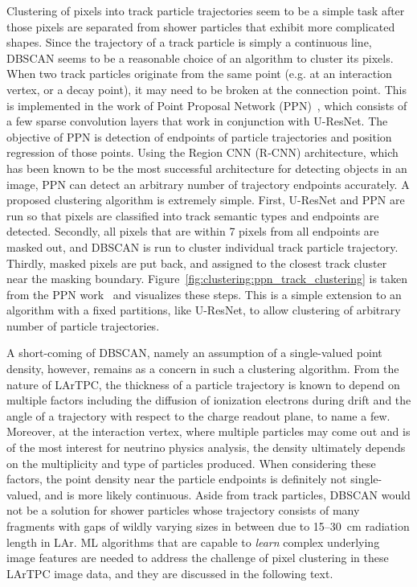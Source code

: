 \documentclass{ws-rv9x6}
\begin{document}
Clustering of pixels into track particle trajectories seem to be a simple task after those pixels are separated from shower particles that exhibit more complicated shapes. Since the trajectory of a track particle is simply a continuous line, DBSCAN seems to be a reasonable choice of an algorithm to cluster its pixels. When two track particles originate from the same point (e.g. at an interaction vertex, or a decay point), it may need to be broken at the connection point. This is implemented in the work of Point Proposal Network (PPN)~\cite{Domine:2020tlx,domine_laura_2018_1300713}, which consists of a few sparse convolution layers that work in conjunction with U-ResNet. The objective of PPN is  detection of endpoints of particle trajectories and position regression of those points. Using the Region CNN (R-CNN) architecture, which has been known to be the most successful architecture for detecting objects in an image, PPN can detect an arbitrary number of trajectory endpoints accurately. A proposed clustering algorithm is extremely simple. First, U-ResNet and PPN are run so that pixels are classified into track semantic types and endpoints are detected. Secondly, all pixels that are within 7 pixels from all endpoints are masked out, and DBSCAN is run to cluster individual track particle trajectory. Thirdly, masked pixels are put back, and assigned to the closest track cluster near the masking boundary. Figure~\ref{fig:clustering:ppn_track_clustering} is taken from the PPN work~\cite{Domine:2020tlx} and visualizes these steps. This is a simple extension to an algorithm with a fixed partitions, like U-ResNet, to allow clustering of arbitrary number of particle trajectories.

A short-coming of DBSCAN, namely an assumption of a single-valued point density, however, remains as a concern in such a clustering algorithm. From the nature of LArTPC, the thickness of a particle trajectory is known to depend on multiple factors including the diffusion of ionization electrons during drift and the angle of a trajectory with respect to the charge readout plane, to name a few. Moreover, at the interaction vertex, where multiple particles may come out and is of the most interest for neutrino physics analysis, the density ultimately depends on the multiplicity and type of particles produced. When considering these factors, the point density near the particle endpoints is definitely not single-valued, and is more likely continuous. Aside from track particles, DBSCAN would not be a solution for shower particles whose trajectory consists of many fragments with gaps of wildly varying sizes in between due to 15--30~cm radiation length in LAr. ML algorithms that are capable to {\it learn} complex underlying image features are needed to address the challenge of pixel clustering in these LArTPC image data, and they are discussed in the following text.
\end{document}
